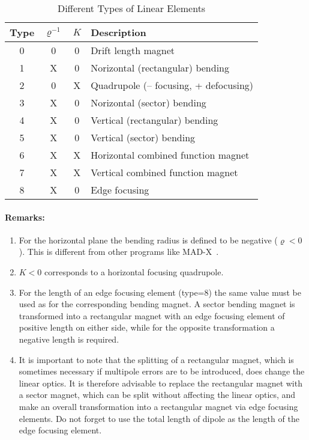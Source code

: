 \begin{table}[h]
    \caption{Different Types of Linear Elements}
    \label{T-LinEle}
    \centering
    \begin{tabular}{|c|c|c|l|}
        \hline
        \rowcolor{blue!30}
        Type & $ \varrho^{-1} $ & $K$ & Description \\
        \hline
        0 & 0 & 0 & Drift length magnet \\
        1 & X & 0 & Norizontal (rectangular) bending \\
        2 & 0 & X & Quadrupole (-- focusing, + defocusing) \\
        3 & X & 0 & Norizontal (sector) bending \\
        4 & X & 0 & Vertical (rectangular) bending \\
        5 & X & 0 & Vertical (sector) bending \\
        6 & X & X & Horizontal combined function magnet \\
        7 & X & X & Vertical combined function magnet \\
        8 & X & 0 & Edge focusing \\
        \hline
    \end{tabular}
\end{table}

\paragraph{Remarks:}
\begin{enumerate}
    \item For the horizontal plane the bending radius is defined to be negative \mbox{($ \varrho < 0 $).} This is different from other programs like MAD-X~\cite{MAD}.
    \item $ K < 0 $ corresponds to a horizontal focusing quadrupole.
    \item For the length of an edge focusing element (type=8) the same value must be used as for the corresponding bending magnet. A sector bending magnet is transformed into a rectangular magnet with an edge focusing element of positive length on either side, while for the opposite transformation a negative length is required.
    \item It is important to note that the splitting of a rectangular magnet, which is sometimes necessary if multipole errors are to be introduced, does change the linear optics. It is therefore advisable to replace the rectangular magnet with a sector magnet, which can be split without affecting the linear optics, and make an overall transformation into a rectangular magnet via edge focusing elements. Do not forget to use the total length of dipole as the length of the edge focusing element.
\end{enumerate}

